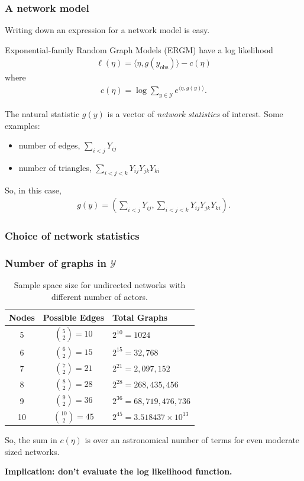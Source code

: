 \documentclass[slidestop,compress, 10pt]{beamer}
\def\YY{{\mathcal Y}}
\newcommand{\inner}[1]{\langle #1 \rangle}
\newcommand{\yobs}{y_{\text{obs}}}
\begin{document}
\frame
{
\frametitle{A network model}

Writing down an expression for a network model is easy.  

Exponential-family Random Graph Models (ERGM) have a log likelihood
\begin{align*}%
	\ell( \eta) = \inner{\eta, g(\yobs)} - c(\eta)
\end{align*}
where
\begin{align*}
	c(\eta) = \log \sum_{y \in \YY} e^{\inner{\eta, g(y)}}.
\end{align*}

The natural statistic $g(y)$ is a vector of \emph{network statistics} of interest.  Some examples:
\begin{itemize}
	\item number of edges, $\sum_{i<j} Y_{ij}$
	\item number of triangles, $\sum_{i < j < k} Y_{ij}Y_{jk}Y_{ki}$
\end{itemize}
So, in this case,
\begin{align*}
	g(y) = \left( \sum_{i<j} Y_{ij}, 
					\sum_{i < j < k} Y_{ij}Y_{jk}Y_{ki} \right ).
\end{align*}


}

\frame
{
\frametitle{Choice of network statistics}

}
\frame
{
\frametitle{Number of graphs in $\YY$}
\begin{table}[h!] 
\caption{Sample space size for undirected networks with different number of 
actors.}

\begin{tabular}{ccl} 
\hline 
Nodes & Possible Edges & Total Graphs \\ [1ex]
\hline
5 & ${5 \choose 2} = 10$ & $2^{10} = 1024$ \\ [1ex]
6 & ${6 \choose 2} = 15$ & $2^{15} = 32,768$ \\ [1ex]
7 & ${7 \choose 2} = 21$ & $2^{21} = 2,097,152$ \\ [1ex]
8 & ${8 \choose 2} = 28$ & $2^{28} = 268,435,456$ \\ [1ex]
9 & ${9 \choose 2} = 36$ & $2^{36} = 68,719,476,736$ \\ [1ex]
10 & ${10 \choose 2} = 45$ & $2^{45} = 3.518437\times10^{13}$ \\ [1ex]
\hline 
\end{tabular} \label{T:number graphs}
\end{table}

So, the sum in $c(\eta)$ is over an astronomical number of terms for 
even moderate sized networks.
\vspace{2mm}

\textbf{Implication: don't evaluate the log likelihood function.}
}
\end{document}
